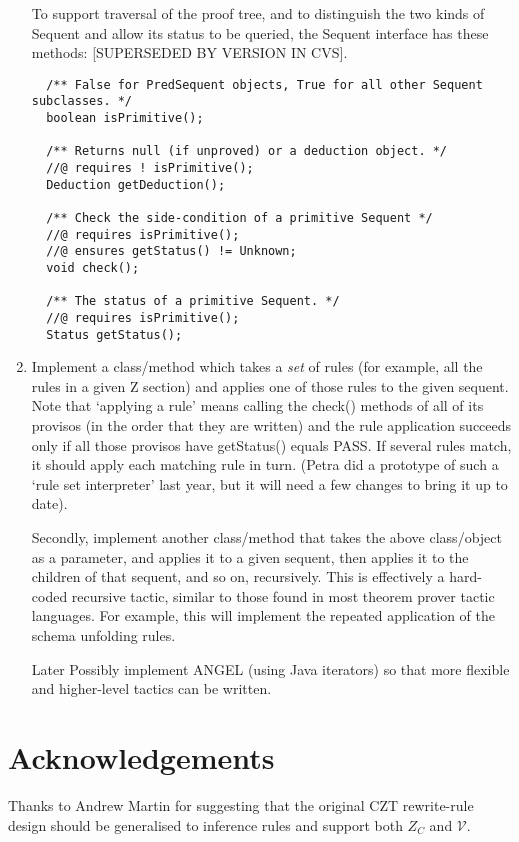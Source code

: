 \documentclass{article}
\newcommand{\V}{\mathcal{V}}
\begin{document}
\begin{enumerate}
  To support traversal of the proof tree, and to distinguish
  the two kinds of Sequent and allow its status to be queried,
  the Sequent interface has these methods: [SUPERSEDED BY VERSION
  IN CVS].
\begin{verbatim}
  /** False for PredSequent objects, True for all other Sequent subclasses. */
  boolean isPrimitive();

  /** Returns null (if unproved) or a deduction object. */
  //@ requires ! isPrimitive();
  Deduction getDeduction();

  /** Check the side-condition of a primitive Sequent */
  //@ requires isPrimitive();
  //@ ensures getStatus() != Unknown;
  void check();

  /** The status of a primitive Sequent. */
  //@ requires isPrimitive();
  Status getStatus();
\end{verbatim}


\item Implement a class/method 
  which takes a \emph{set} of rules (for example, all the rules
  in a given Z section) and applies one of those rules to the given
  sequent.  Note that `applying a rule' means calling the check()
  methods of all of its provisos (in the order that they are written)
  and the rule application succeeds only if all those provisos have
  getStatus() equals PASS.
  If several rules match, it should apply each matching rule
  in turn.  (Petra did a prototype of such a `rule set interpreter'
  last year, but it will need a few changes to bring it up to date).


  Secondly, implement another class/method that takes
  the above class/object as a parameter, and applies it
  to a given sequent, then applies it to the
  children of that sequent, and so on, recursively.  This is effectively
  a hard-coded recursive tactic, similar to those found in most
  theorem prover tactic languages.  For example, this will
  implement the repeated application of the schema unfolding rules.

\item [Later] Possibly implement ANGEL (using Java iterators)
  so that more flexible and higher-level tactics can be written.
\end{enumerate}

\section{Acknowledgements}

Thanks to Andrew Martin for suggesting that the original
CZT rewrite-rule design should be generalised to inference
rules and support both $Z_C$ and $\V$.



\end{document}

